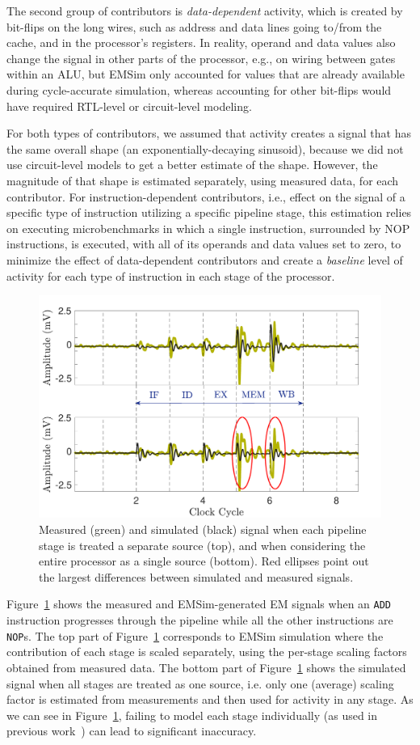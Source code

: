 The second group of contributors is \textit{data-dependent} activity, which is created by bit-flips on the long wires, such as address and data lines going to/from the cache, and in the processor's registers. In reality, operand and data values also change the signal in other parts of the processor, e.g., on wiring between gates within an ALU, but EMSim only accounted for values that are already available during cycle-accurate simulation, whereas accounting for other bit-flips would have required RTL-level or circuit-level modeling.

For both types of contributors, we assumed that activity creates a signal that has the same overall shape (an exponentially-decaying sinusoid), because we did not use circuit-level models to get a better estimate of the shape. However, the magnitude of that shape is estimated separately, using measured data, for each contributor. For instruction-dependent contributors, i.e., effect on the signal of a specific type of instruction utilizing a specific pipeline stage, this estimation relies on executing microbenchmarks in which a single instruction, surrounded by NOP instructions, is executed, with all of its operands and data values set to zero,
to minimize the effect of data-dependent contributors and create a \emph{baseline} level of activity for each type of instruction in each stage of the processor.

\begin{figure}
	\centering
\vspace{-0.2in}
	\includegraphics[width=0.45\columnwidth,clip]{figure/amp2.pdf}
\vspace{-0.3in}
	\caption{Measured (green) and simulated (black) signal when each pipeline stage is treated a separate source (top), and when considering the entire processor as a single source (bottom). Red ellipses point out the largest differences between simulated and measured signals.}
	\label{fig:amp}
\end{figure}
Figure~\ref{fig:amp} shows the measured and EMSim-generated EM signals when an {\tt ADD} instruction progresses through the pipeline while all the other instructions are {\tt NOP}s. The top part of Figure~\ref{fig:amp} corresponds to EMSim simulation where the contribution of each stage is scaled separately, using the per-stage scaling factors obtained from measured data. The bottom part of Figure~\ref{fig:amp} shows the simulated signal when all stages are treated as one source, i.e. only one (average) scaling factor is estimated from measurements and then used for activity in any stage. As we can see in Figure~\ref{fig:amp}, failing to model each stage individually (as used in previous work~\cite{McCann:2017:TPT:3241189.3241207}) can lead to significant inaccuracy.

